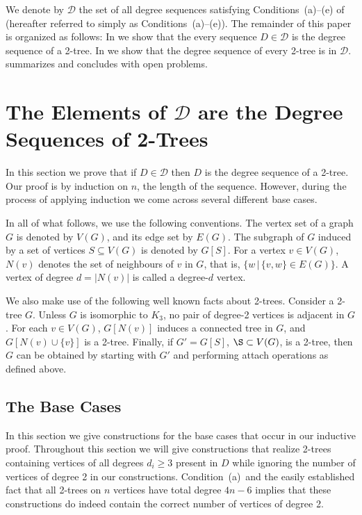\documentclass[lotsofwhite,charterfonts]{patmorin}
\newcommand{\degreesum}{Condition~(a)}
\begin{document}
We denote by $\mathcal{D}$ the set of all degree sequences satisfying
Conditions~(a)--(e) of  (hereafter referred to simply as
Conditions~(a)--(e)).  The remainder of this paper is organized as
follows:  In  we show that the every sequence $D\in
\mathcal{D}$ is the degree sequence of a 2-tree.  In 
we show that the degree sequence of every 2-tree is in $\mathcal{D}$.
 summarizes and concludes with open problems.

\section{The Elements of $\mathcal{D}$ are the Degree Sequences of
	2-Trees}

In this section we prove that if $D\in \mathcal{D}$ then $D$ is the
degree sequence of a 2-tree.  Our proof is by induction on $n$, the
length of the sequence.  However, during the process of applying
induction we come across several different base cases.

In all of what follows, we use the following conventions.  The vertex
set of a graph $G$ is denoted by $V(G)$, and its edge set by $E(G)$.
The subgraph of $G$ induced by a set of vertices $S\subseteq V(G)$ is
denoted by $G[S]$. For a vertex $v\in V(G)$, $N(v)$ denotes the set
of neighbours of $v$ in $G$, that is, $\{w\,|\, \{v,w\}\in E(G)\}$.  A
vertex of degree $d=|N(v)|$ is called a degree-$d$ vertex.

We also make use of the following well known facts about 2-trees.
Consider a 2-tree $G$. Unless $G$ is isomorphic to $K_3$, no pair of
degree-2 vertices is adjacent in $G$. For each $v\in V(G)$, $G[N(v)]$
induces a connected tree in $G$, and $G[N(v)\cup \{v\}]$ is a 2-tree.
Finally, if $G'=G[S]$, $\S\subset V(G)$, is a 2-tree, then $G$ can be
obtained by starting with $G'$ and performing attach operations as
defined above. 

\subsection{The Base Cases}

In this section we give constructions for the base cases that occur in
our inductive proof.  Throughout this section we will give
constructions that realize 2-trees containing vertices of all degrees
$d_i\ge 3$ present in $D$ while ignoring the number of vertices of
degree 2 in our constructions.  \degreesum\ and the easily established
fact that all 2-trees on $n$ vertices have total degree $4n-6$ implies
that these constructions do indeed contain the correct number of
vertices of degree 2.
\end{document}
